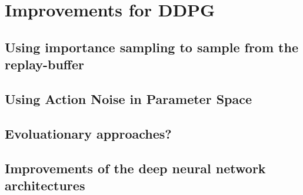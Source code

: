 \section{Improvements for DDPG}
\subsection{Using importance sampling to sample from the replay-buffer}
\subsection{Using Action Noise in Parameter Space}
\subsection{Evoluationary approaches?}
\subsection{Improvements of the deep neural network architectures}
\label{sec:1}

